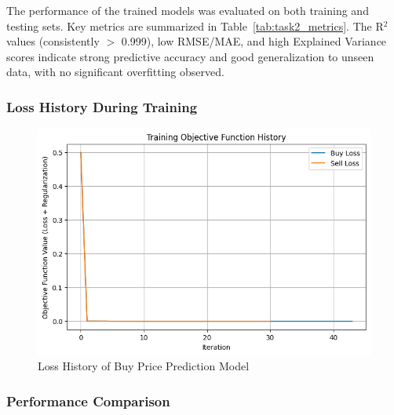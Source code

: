 The performance of the trained models was evaluated on both training and testing sets.
Key metrics are summarized in Table~\ref{tab:task2_metrics}.
The R$^2$ values (consistently $>$ 0.999), low RMSE/MAE, and high Explained Variance scores indicate strong predictive accuracy and good generalization to unseen data, with no significant overfitting observed.

\smallskip

\subsubsection{Loss History During Training}\text{}


\begin{figure}[H]
    \centering
    \includegraphics[width=\linewidth]{images/loss_history}
    \caption{Loss History of Buy Price Prediction Model}
    \label{fig:buy_price_model_loss}
\end{figure}

\subsubsection{Performance Comparison}\text{}



